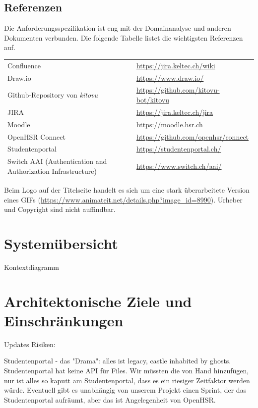 \documentclass[a4paper]{article}
\let\oldsection\section
\renewcommand\section{\clearpage\oldsection}
\def\jiraurl{https://jira.keltec.ch/jira}
\def\confluenceurl{https://jira.keltec.ch/wiki}
\begin{document}
\subsection{Referenzen}
Die Anforderungsspezifikation ist eng mit der Domainanalyse und anderen Dokumenten verbunden. Die folgende Tabelle listet die wichtigsten Referenzen auf.

\begin{tabulary}{\linewidth}{Ll}
	Confluence & \url{\confluenceurl} \\
	Draw.io & \url{https://www.draw.io/} \\
	Github-Repository von \emph{kitovu} & \url{https://github.com/kitovu-bot/kitovu} \\
	JIRA	& \url{\jiraurl} \\
	Moodle & \url{https://moodle.hsr.ch} \\
	OpenHSR Connect & \url{https://github.com/openhsr/connect} \\
	Studentenportal & \url{https://studentenportal.ch/} \\
	Switch AAI \newline (Authentication and Authorization Infrastructure)& \url{https://www.switch.ch/aai/} \\
\end{tabulary}

Beim Logo auf der Titelseite handelt es sich um eine stark überarbeitete Version eines GIFs (\url{https://www.animateit.net/details.php?image_id=8990}). Urheber und Copyright sind nicht auffindbar.

\pagebreak

\section{Systemübersicht}


Kontextdiagramm


\section{Architektonische Ziele und Einschränkungen}

Updates Risiken:

Studentenportal - das "Drama": alles ist legacy, castle inhabited by ghosts. Studentenportal hat keine API für Files. Wir müssten die von Hand hinzufügen, nur ist alles so kaputt am Studentenportal, dass es ein riesiger Zeitfaktor werden würde. Eventuell gibt es unabhängig von unserem Projekt einen Sprint, der das Studentenportal aufräumt, aber das ist Angelegenheit von OpenHSR.
\end{document}
